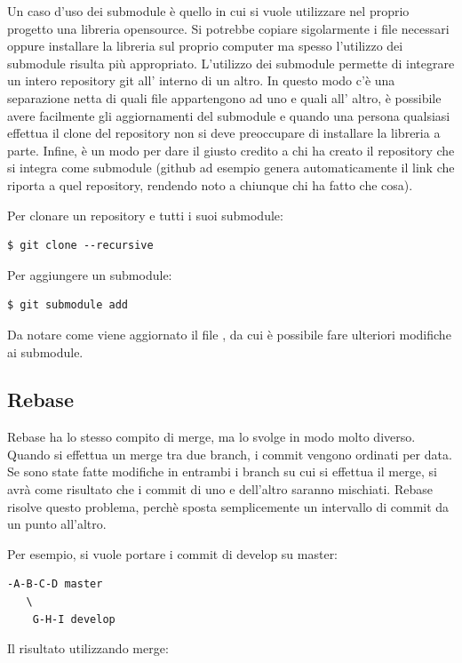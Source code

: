 \documentclass{article}
\begin{document}
Un caso d'uso dei submodule è quello in cui si vuole utilizzare nel proprio
progetto una libreria opensource. Si potrebbe copiare sigolarmente i file
necessari oppure installare la libreria sul proprio computer ma spesso
l'utilizzo dei submodule risulta più appropriato.
L'utilizzo dei submodule permette di integrare un intero repository git all'
interno di un altro. In questo modo c'è una separazione netta di quali file
appartengono ad uno e quali all' altro, è possibile avere facilmente gli
aggiornamenti del submodule e quando una persona qualsiasi effettua il clone
del repository non si deve preoccupare di installare la libreria a parte.
Infine, è un modo per dare il giusto credito a chi ha creato il repository che
si integra come submodule (github ad esempio genera automaticamente il link che
riporta a quel repository, rendendo noto a chiunque chi ha fatto che cosa).

Per clonare un repository e tutti i suoi submodule:

\begin{verbatim}
$ git clone --recursive
\end{verbatim}

Per aggiungere un submodule:

\begin{verbatim}
$ git submodule add 
\end{verbatim}

Da notare come viene aggiornato il file , da cui è possibile
fare ulteriori modifiche ai submodule.

\subsection{Rebase}

Rebase ha lo stesso compito di merge, ma lo svolge in modo molto diverso. Quando
si effettua un merge tra due branch, i commit vengono ordinati per data. Se sono
state fatte modifiche in entrambi i branch su cui si effettua il merge, si avrà
come risultato che i commit di uno e dell'altro saranno mischiati.
Rebase risolve questo problema, perchè sposta semplicemente un intervallo di
commit da un punto all'altro.

Per esempio, si vuole portare i commit di develop su master:

\begin{verbatim}
-A-B-C-D master
   \
    G-H-I develop
\end{verbatim}

Il risultato utilizzando merge:
\end{document}
